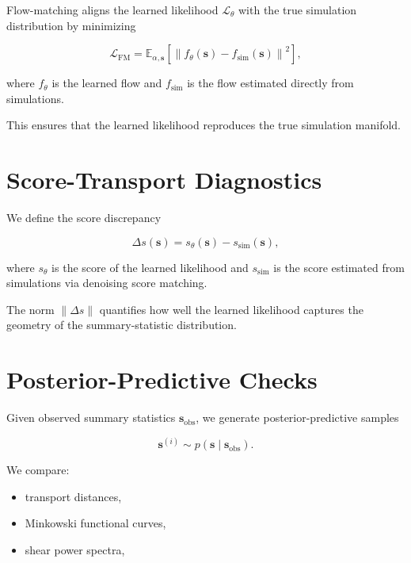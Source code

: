 \documentclass[11pt,a4paper]{article}
\begin{document}
Flow-matching aligns the learned likelihood $\mathcal{L}_{\theta}$ with the true 
simulation distribution by minimizing



\[
    \mathcal{L}_{\mathrm{FM}}
    =
    \mathbb{E}_{\alpha, \mathbf{s}}
    \left[
        \left\|
            f_{\theta}(\mathbf{s}) - f_{\mathrm{sim}}(\mathbf{s})
        \right\|^{2}
    \right],
\]



where $f_{\theta}$ is the learned flow and $f_{\mathrm{sim}}$ is the flow 
estimated directly from simulations.

This ensures that the learned likelihood reproduces the true simulation manifold.
\section{Score-Transport Diagnostics}

We define the score discrepancy



\[
    \Delta s(\mathbf{s})
    =
    s_{\theta}(\mathbf{s})
    -
    s_{\mathrm{sim}}(\mathbf{s}),
\]



where $s_{\theta}$ is the score of the learned likelihood and $s_{\mathrm{sim}}$ 
is the score estimated from simulations via denoising score matching.

The norm $\|\Delta s\|$ quantifies how well the learned likelihood captures the 
geometry of the summary-statistic distribution.
\section{Posterior-Predictive Checks}

Given observed summary statistics $\mathbf{s}_{\mathrm{obs}}$, we generate 
posterior-predictive samples



\[
    \mathbf{s}^{(i)} \sim p(\mathbf{s} \mid \mathbf{s}_{\mathrm{obs}}).
\]



We compare:

\begin{itemize}
    \item transport distances,
    \item Minkowski functional curves,
    \item shear power spectra,
\end{itemize}
\end{document}
